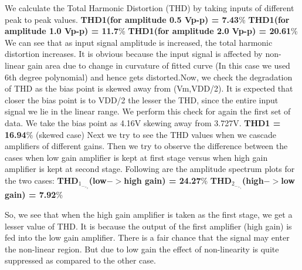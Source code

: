 \documentclass[12pt]{article}
\begin{document}
We calculate the Total Harmonic Distortion (THD) by taking inputs of different peak to peak values. \newline
\textbf{THD1(for amplitude 0.5 Vp-p) = 7.43}\% \newline
\textbf{THD1(for amplitude 1.0 Vp-p) = 11.7}\% \newline
\textbf{THD1(for amplitude 2.0 Vp-p) = 20.61}\% \newline \newline
We can see that as input signal amplitude is increased, the total harmonic distortion increases. It is obvious because the input signal is affected by non-linear gain area due to change in curvature of fitted curve (In this case we used 6th
degree polynomial) and hence gets distorted.Now, we check the degradation of THD as the bias point is skewed away from (Vm,VDD/2). It is expected that closer the bias point is to VDD/2 the lesser the THD, since the entire input signal we lie in the linear range.
\newline \newline
We perform this check for again the first set of data. We take the bias point as 4.16V skewing away from 3.727V.
\newline \newline
\textbf{THD1 = 16.94}\% \newline
(skewed case)
\newline \newline
Next we try to see the THD values when we cascade amplifiers of different gains. Then we try to observe the difference between the cases when low gain amplifier is kept at first stage versus when high gain amplifier is kept at second stage. Following are the amplitude spectrum plots for the two cases:
\newline \newline
\textbf{THD$_1_-_>_2$(low$->$high gain) = 24.27}\%  \newline
\textbf{THD$_2_-_>_1$(high$->$low gain) = 7.92}\% \newline \newline

So, we see that when the high gain amplifier is taken as the first stage, we get a lesser value of THD. It is because the output of the first amplifier (high gain) is fed into the low gain amplifier. There is a fair chance that the signal may enter the non-linear region. But due to low gain the effect of non-linearity is quite suppressed as compared to the other case.
\newline \newline
\end{document}

